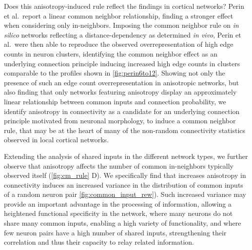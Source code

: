 Does this anisotropy-induced rule reflect the findings in cortical
networks?  Perin et al.\ report a linear common neighbor relationship,
finding a stronger effect when considering only in-neighbors. Imposing
the common neighbor rule on \textit{in silico} networks reflecting a
distance-dependency as determined \textit{in vivo}, Perin et al.\ were
then able to reproduce the observed overrepresentation of high edge
counts in neuron clusters, identifying the common neighbor effect as
an underlying connection principle inducing increased high edge counts
in clusters comparable to the profiles shown in
\autoref{fig:perin6to12}. Showing not only the presence of such an
edge count 
overrepresentation in anisotropic networks, but also finding that only
networks featuring anisotropy display an approximately linear
relationship between common inputs and connection probability, we
identify anisotropy in connectivity as a candidate for an underlying
connection principle motivated from neuronal morphology, to induce a
common neighbor rule, that may be at the heart of many of the
non-random connectivity statistics observed in local cortical
networks.

Extending the analysis of shared inputs in the different network
types, we further observe that anisotropy affects the number of common
in-neighbors typically observed itself (\autoref{fig:cm_rule} D). We
specifically find that increases anisotropy in connectivity induces an
increased variance in the distribution of common inputs of a random
neuron pair \autoref{fig:common_input_rew}). Such increased variance
may provide an important advantage in the processing of information,
allowing a heightened functional specificity in the network, where
many neurons do not share many common inputs, enabling a high variety
of functionality, and where few neuron pairs have a high number of
shared inputs, strengthening their correlation and thus their capacity
to relay related information.


